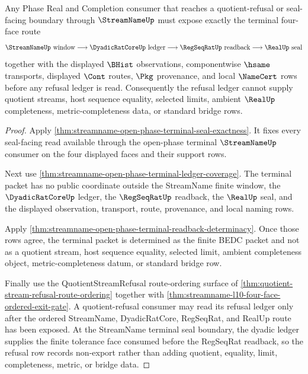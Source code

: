 \begin{theorem}
\label{thm:streamname-regseqrat-realup-terminal-seal-boundary}
Any Phase Real and Completion consumer that reaches a quotient-refusal or seal-facing boundary through $\StreamNameUp$ must expose exactly the terminal four-face route
$$
\StreamNameUp\text{ window}\longrightarrow \DyadicRatCoreUp\text{ ledger}\longrightarrow \RegSeqRatUp\text{ readback}\longrightarrow \RealUp\text{ seal}
$$
together with the displayed $\BHist$ observations, componentwise $\hsame$ transports, displayed $\Cont$ routes, $\Pkg$ provenance, and local $\NameCert$ rows before any refusal ledger is read. Consequently the refusal ledger cannot supply quotient streams, host sequence equality, selected limits, ambient $\RealUp$ completeness, metric-completeness data, or standard bridge rows.
\end{theorem}
\begin{proof}
Apply \autoref{thm:streamname-open-phase-terminal-seal-exactness}. It fixes every seal-facing read available through the open-phase terminal $\StreamNameUp$ consumer on the four displayed faces and their support rows.

Next use \autoref{thm:streamname-open-phase-terminal-ledger-coverage}. The terminal packet has no public coordinate outside the StreamName finite window, the $\DyadicRatCoreUp$ ledger, the $\RegSeqRatUp$ readback, the $\RealUp$ seal, and the displayed observation, transport, route, provenance, and local naming rows.

Apply \autoref{thm:streamname-open-phase-terminal-readback-determinacy}. Once those rows agree, the terminal packet is determined as the finite BEDC packet and not as a quotient stream, host sequence equality, selected limit, ambient completeness object, metric-completeness datum, or standard bridge row.

Finally use the QuotientStreamRefusal route-ordering surface of \autoref{thm:quotient-stream-refusal-route-ordering} together with \autoref{thm:streamname-l10-four-face-ordered-exit-gate}. A quotient-refusal consumer may read its refusal ledger only after the ordered StreamName, DyadicRatCore, RegSeqRat, and RealUp route has been exposed. At the StreamName terminal seal boundary, the dyadic ledger supplies the finite tolerance face consumed before the RegSeqRat readback, so the refusal row records non-export rather than adding quotient, equality, limit, completeness, metric, or bridge data.
\end{proof}

